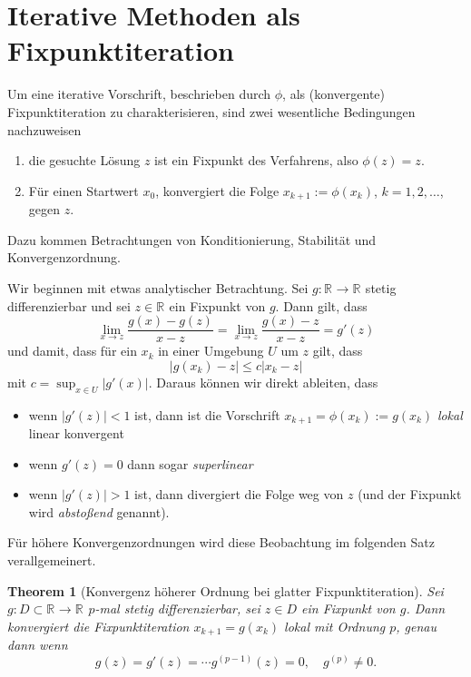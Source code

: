 \documentclass[
]{book}
\providecommand{\tightlist}{%
  \setlength{\itemsep}{0pt}\setlength{\parskip}{0pt}}
\newtheorem{theorem}{Theorem}[chapter]
\theoremstyle{definition}
\theoremstyle{definition}
\theoremstyle{definition}
\theoremstyle{definition}
\theoremstyle{remark}
\begin{document}
\hypertarget{iterative-methoden-als-fixpunktiteration}{%
\section{Iterative Methoden als Fixpunktiteration}\label{iterative-methoden-als-fixpunktiteration}}

Um eine iterative Vorschrift, beschrieben durch \(\phi\), als (konvergente) Fixpunktiteration zu charakterisieren, sind zwei wesentliche Bedingungen nachzuweisen

\begin{enumerate}
\def\labelenumi{\arabic{enumi}.}
\tightlist
\item
  die gesuchte Lösung \(z\) ist ein Fixpunkt des Verfahrens, also \(\phi(z)=z\).
\item
  Für einen Startwert \(x_0\), konvergiert die Folge \(x_{k+1}:=\phi(x_k)\), \(k=1,2,\dotsc\), gegen \(z\).
\end{enumerate}

Dazu kommen Betrachtungen von Konditionierung, Stabilität und Konvergenzordnung.

Wir beginnen mit etwas analytischer Betrachtung. Sei \(g \colon \mathbb R^{}\to \mathbb R^{}\) stetig differenzierbar und sei \(z\in \mathbb R^{}\) ein Fixpunkt von \(g\). Dann gilt, dass
\begin{equation*}
\lim_{x\to z} \frac{g(x)-g(z)}{x-z} = \lim_{x\to z} \frac{g(x)-z}{x-z} = g'(z)
\end{equation*}
und damit, dass für ein \(x_k\) in einer Umgebung \(U\) um \(z\) gilt, dass
\begin{equation*}
|g(x_k)-z|\leq c |x_k-z|
\end{equation*}
mit \(c=\sup_{x\in U}|g'(x)|\).
Daraus können wir direkt ableiten, dass

\begin{itemize}
\tightlist
\item
  wenn \(|g'(z)|<1\) ist, dann ist die Vorschrift \(x_{k+1}=\phi(x_k):=g(x_k)\) \emph{lokal} linear konvergent
\item
  wenn \(g'(z)=0\) dann sogar \emph{superlinear}
\item
  wenn \(|g'(z)|>1\) ist, dann divergiert die Folge weg von \(z\) (und der Fixpunkt wird \emph{abstoßend} genannt).
\end{itemize}

Für höhere Konvergenzordnungen wird diese Beobachtung im folgenden Satz verallgemeinert.

\begin{theorem}[Konvergenz höherer Ordnung bei glatter Fixpunktiteration]
\protect\hypertarget{thm:thm-smooth-fp-conv}{}\label{thm:thm-smooth-fp-conv}Sei \(g\colon D\subset \mathbb R^{}\to \mathbb R^{}\) \(p\)-mal stetig differenzierbar, sei \(z\in D\) ein Fixpunkt von \(g\). Dann konvergiert die Fixpunktiteration \(x_{k+1}=g(x_k)\) \emph{lokal} mit Ordnung \(p\), genau dann wenn
\begin{equation*}
g(z)=g'(z)=\dotsm g^{(p-1)}(z)=0, \quad g^{(p)}\neq 0.
\end{equation*}
\end{theorem}
\end{document}
